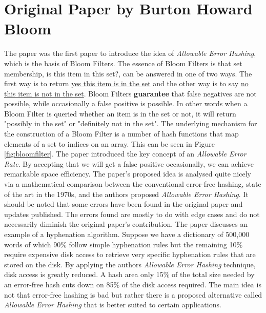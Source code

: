 \documentclass[MScCS]{uccthesis}
\begin{document}
\section{Original Paper by Burton Howard Bloom}
The paper was the first paper to introduce the idea of \textit{Allowable Error Hashing}, which is the basis of Bloom Filters. The essence of Bloom Filters is that set membership, is this item in this set?, can be answered in one of two ways. The first way is to return \underline{yes this item is in the set} and the other way is to say \underline{no this item is not in the set}. Bloom Filters \textbf{guarantee} that false negatives are not possible, while occasionally a false positive is possible. In other words when a Bloom Filter is queried whether an item is in the set or not, it will return "possibly in the set" or "definitely not in the set". The underlying mechanism for the construction of a Bloom Filter is a number of hash functions that map elements of a set to indices on an array. This can be seen in Figure \ref{fig:bloomfilter}. The paper introduced the key concept of an \textit{Allowable Error Rate}. By accepting that we will get a false positive occasionally, we can achieve remarkable space efficiency. The paper's proposed idea is analysed quite nicely via a mathematical comparison between the conventional error-free hashing, state of the art in the 1970s, and the authors proposed \textit{Allowable Error Hashing}. It should be noted that some errors have been found in the original paper and updates published\cite{bose2008false}. The errors found are mostly to do with edge cases and do not necessarily diminish the original paper's contribution. The paper discusses an example of a hyphenation algorithm. Suppose we have a dictionary of 500,000 words of which 90\% follow simple hyphenation rules but the remaining 10\% require expensive disk access to retrieve very specific hyphenation rules that are stored on the disk. By applying the authors \textit{Allowable Error Hashing} technique, disk access is greatly reduced. A hash area only 15\% of the total size needed by an error-free hash cuts down on 85\% of the disk access required. The main idea is not that error-free hashing is bad but rather there is a proposed alternative called \textit{Allowable Error Hashing} that is better suited to certain applications.
\end{document}
